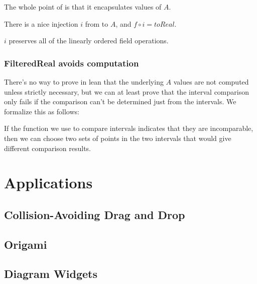 The whole point of  is that it encapsulates values of
$A$.

\begin{definition}
  \label{def:filteredToA}
  \notready
  There is a nice injection $i$ from  to
  $A$, and $f \circ i = toReal$.
\end{definition}

\begin{theorem}
  \label{def:filteredEquivalent}
  \notready
  $i$ preserves all of the linearly ordered field operations.
\end{theorem}

\subsection{FilteredReal avoids computation}

There's no way to prove in lean that the underlying $A$ values are not computed
unless strictly necessary, but we can at least prove that the interval
comparison only fails if the comparison can't be determined just from the
intervals. We formalize this as follows:

\begin{lemma}
  \label{thm:compareComplete}
  \leanok
  If the function we use to compare intervals indicates that they are
  incomparable, then we can choose two sets of points in the two intervals that
  would give different comparison results.
\end{lemma}

\chapter{Applications}

\section{Collision-Avoiding Drag and Drop}

\section{Origami}

\section{Diagram Widgets}


